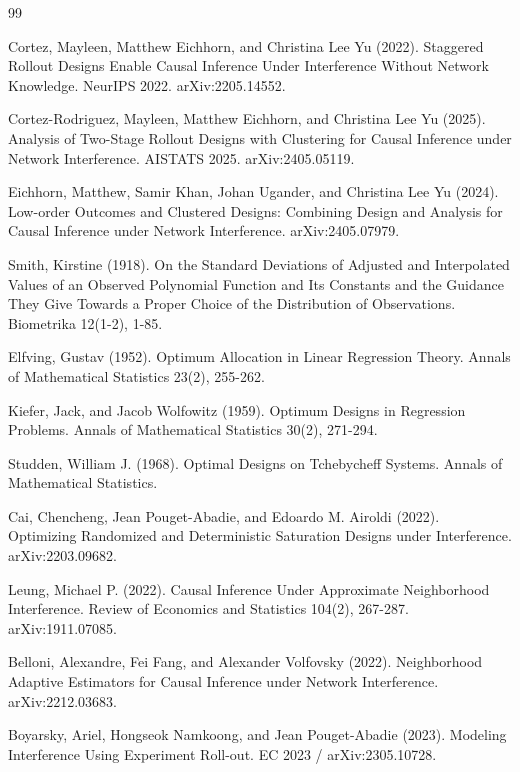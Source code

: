 \documentclass{article}
\begin{document}
\begin{thebibliography}{99}

   Cortez, Mayleen, Matthew Eichhorn, and Christina Lee Yu (2022). Staggered Rollout Designs Enable Causal Inference Under Interference Without Network Knowledge. NeurIPS 2022. arXiv:2205.14552.

   Cortez-Rodriguez, Mayleen, Matthew Eichhorn, and Christina Lee Yu (2025). Analysis of Two-Stage Rollout Designs with Clustering for Causal Inference under Network Interference. AISTATS 2025. arXiv:2405.05119.

   Eichhorn, Matthew, Samir Khan, Johan Ugander, and Christina Lee Yu (2024). Low-order Outcomes and Clustered Designs: Combining Design and Analysis for Causal Inference under Network Interference. arXiv:2405.07979.

   Smith, Kirstine (1918). On the Standard Deviations of Adjusted and Interpolated Values of an Observed Polynomial Function and Its Constants and the Guidance They Give Towards a Proper Choice of the Distribution of Observations. Biometrika 12(1-2), 1-85.

   Elfving, Gustav (1952). Optimum Allocation in Linear Regression Theory. Annals of Mathematical Statistics 23(2), 255-262.

   Kiefer, Jack, and Jacob Wolfowitz (1959). Optimum Designs in Regression Problems. Annals of Mathematical Statistics 30(2), 271-294.

   Studden, William J. (1968). Optimal Designs on Tchebycheff Systems. Annals of Mathematical Statistics.

   Cai, Chencheng, Jean Pouget-Abadie, and Edoardo M. Airoldi (2022). Optimizing Randomized and Deterministic Saturation Designs under Interference. arXiv:2203.09682.

   Leung, Michael P. (2022). Causal Inference Under Approximate Neighborhood Interference. Review of Economics and Statistics 104(2), 267-287. arXiv:1911.07085.

   Belloni, Alexandre, Fei Fang, and Alexander Volfovsky (2022). Neighborhood Adaptive Estimators for Causal Inference under Network Interference. arXiv:2212.03683.

   Boyarsky, Ariel, Hongseok Namkoong, and Jean Pouget-Abadie (2023). Modeling Interference Using Experiment Roll-out. EC 2023 / arXiv:2305.10728.


\end{thebibliography}
\end{document}
